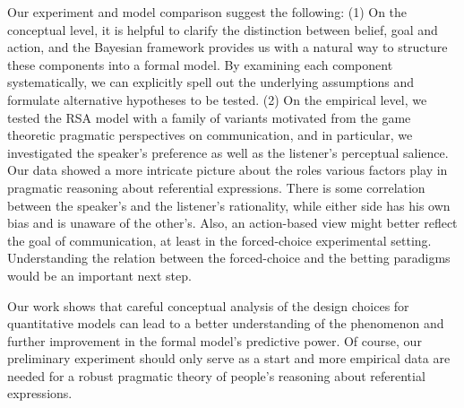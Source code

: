 Our experiment and model comparison suggest the following: (1) On the
conceptual level, it is helpful to clarify the distinction between
belief, goal and action, and the Bayesian framework provides us with a
natural way to structure these components into a formal model. By
examining each component systematically, we can explicitly spell out
the underlying assumptions and formulate alternative hypotheses to be
tested. (2) On the empirical level, we tested the RSA model with a
family of variants motivated from the game theoretic pragmatic
perspectives on communication, and in particular, we investigated the
speaker's preference as well as the listener's perceptual
salience. Our data showed a more intricate picture about the roles
various factors play in pragmatic reasoning about referential
expressions. There is some correlation between the speaker's and the
listener's rationality, while either side has his own bias and is
unaware of the other's. Also, an action-based view might better
reflect the goal of communication, at least in the forced-choice
experimental setting. Understanding the relation between the
forced-choice and the betting paradigms would be an important next
step.

Our work shows that careful conceptual analysis of the design choices for quantitative models can lead to a better understanding of the phenomenon and further improvement in the formal model's predictive power. Of course, our preliminary experiment should only serve as a start and more empirical data are needed for a robust pragmatic theory of people's reasoning about referential expressions. 

